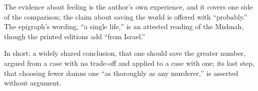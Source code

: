 \begin{afterword}
The evidence about feeling is the author's own experience, and it covers one side of the comparison; the claim about saving the world is offered with ``probably.'' The epigraph's wording, ``a single life,'' is an attested reading of the Mishnah, though the printed editions add ``from Israel.''

In short: a widely shared conclusion, that one should save the greater number, argued from a case with no trade-off and applied to a case with one; its last step, that choosing fewer damns one ``as thoroughly as any murderer,'' is asserted without argument.
\end{afterword}

